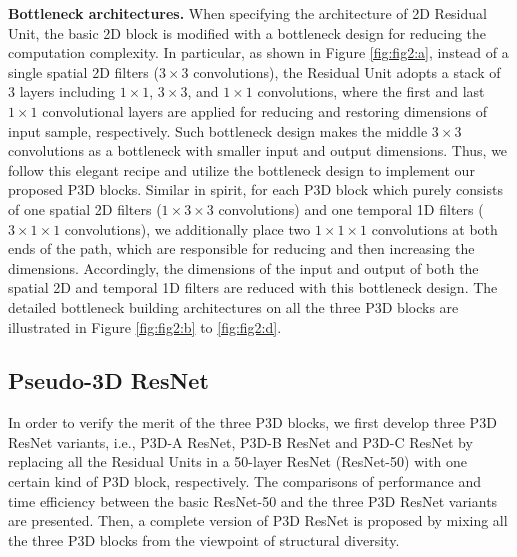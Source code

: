 \documentclass[10pt,twocolumn,letterpaper]{article}
\begin{document}
\textbf{Bottleneck architectures.}
When specifying the architecture of 2D Residual Unit, the basic 2D block is modified with a bottleneck design for reducing the computation complexity. In particular, as shown in Figure \ref{fig:fig2:a}, instead of a single spatial 2D filters ($3 \times 3$ convolutions), the Residual Unit adopts a stack of $3$ layers including $1 \times 1$, $3 \times 3$, and $1 \times 1$ convolutions, where the first and last $1 \times 1$ convolutional layers are applied for reducing and restoring dimensions of input sample, respectively. Such bottleneck design makes the middle $3 \times 3$ convolutions as a bottleneck with smaller input and output dimensions. Thus, we follow this elegant recipe and utilize the bottleneck design to implement our proposed P3D blocks. Similar in spirit, for each P3D block which purely consists of one spatial 2D filters ($1 \times 3 \times 3$ convolutions) and one temporal 1D filters ($3 \times 1 \times 1$ convolutions), we additionally place two $1 \times 1 \times 1$ convolutions at both ends of the path, which are responsible for reducing and then increasing the dimensions. Accordingly, the dimensions of the input and output of both the spatial 2D and temporal 1D filters are reduced with this bottleneck design. The detailed bottleneck building architectures on all the three P3D blocks are illustrated in Figure \ref{fig:fig2:b} to \ref{fig:fig2:d}.

\subsection{Pseudo-3D ResNet}\label{ssec:PDR}
In order to verify the merit of the three P3D blocks, we first develop three P3D ResNet variants, i.e., P3D-A ResNet, P3D-B ResNet and P3D-C ResNet by replacing all the Residual Units in a 50-layer ResNet (ResNet-50) \cite{he2015deep} with one certain kind of P3D block, respectively. The comparisons of performance and time efficiency between the basic ResNet-50 and the three P3D ResNet variants are presented. Then, a complete version of P3D ResNet is proposed by mixing all the three P3D blocks from the viewpoint of structural diversity.
\end{document}
